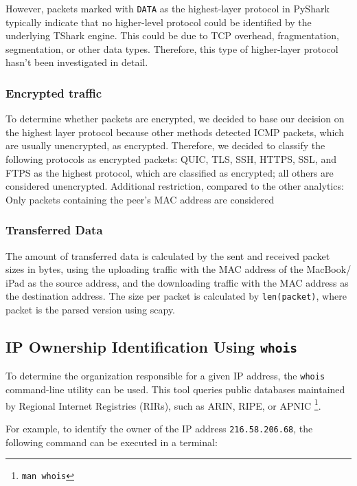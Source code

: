 \documentclass[sigconf,nonacm]{acmart}
\begin{document}
However, packets marked with \texttt{DATA} as the highest-layer protocol in PyShark typically indicate that no higher-level protocol could be identified by the underlying TShark engine. This could be due to TCP overhead, fragmentation, segmentation, or other data types. 
Therefore, this type of higher-layer protocol hasn't been investigated in detail. \cite{wireshark-protocol-hierarchy}

\subsubsection{Encrypted traffic}
To determine whether packets are encrypted, we decided to base our decision on the highest layer protocol because other methods detected ICMP packets, which are usually unencrypted, as encrypted. Therefore, we decided to classify the following protocols as encrypted packets: QUIC, TLS, SSH, HTTPS, SSL, and FTPS as the highest protocol, which are classified as encrypted; all others are considered unencrypted. Additional restriction, compared to the other analytics: Only packets containing the peer's MAC address are considered


\subsubsection{Transferred Data}
The amount of transferred data is calculated by the sent and received packet sizes in bytes, using the uploading traffic with the MAC address of the MacBook/ iPad as the source address, and the downloading traffic with the MAC address as the destination address. 
The size per packet is calculated by \texttt{len(packet)}, where packet is the parsed version using scapy.



\subsection*{IP Ownership Identification Using \texttt{whois}}
\label{sec:whois}

To determine the organization responsible for a given IP address, the \texttt{whois} command-line utility can be used. This tool queries public databases maintained by Regional Internet Registries (RIRs), such as ARIN, RIPE, or APNIC \footnote{\texttt{man whois}}.

For example, to identify the owner of the IP address \texttt{216.58.206.68}, the following command can be executed in a terminal:
\end{document}
